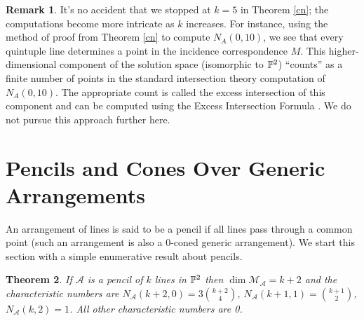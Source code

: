 \documentclass[12pt]{article}
\theoremstyle{plain}
\newtheorem{theorem}{Theorem}
\theoremstyle{definition}
\newtheorem{remark}[theorem]{Remark}
\newcommand{\A}{\mathcal{A}}
\newcommand{\M}{\mathcal{M}}
\newcommand{\N}{N}
\newcommand{\MLA}{\M_{\A}}
\renewcommand{\P}{\ensuremath \mathbb{P}}
\begin{document}
\begin{remark}
  It's no accident that we stopped at $k=5$ in Theorem \ref{cn}; the
  computations become more intricate as $k$ increases. For instance,
  using the method of proof from Theorem \ref{cn} to compute
  $N_A(0,10)$, we see that every quintuple line determines a point in
  the incidence correspondence $M$. This higher-dimensional component
  of the solution space (isomorphic to $\P^2$) ``counts'' as a finite number of points in the
  standard intersection theory computation of $N_A(0,10)$. The
  appropriate count is called the excess intersection of this
  component and can be computed using the Excess
  Intersection Formula \cite[section 6.3]{Fulton}. We do not pursue
  this approach further here. 

\end{remark}

\section{Pencils and Cones Over Generic Arrangements}
\label{section:dconed} 

An arrangement of lines is said to be a pencil if all lines pass
through a common point (such an arrangement is also a $0$-coned
generic arrangement). We start this section with a simple enumerative
result about pencils.

\begin{theorem}
If $\A$ is a pencil of $k$ lines in $\P^2$ then $\dim \MLA = k+2$ and
the characteristic numbers are $\N_\A(k+2,0) = 3\binom{k+2}{4}$,
$\N_\A(k+1,1) = \binom{k+1}{2}$, $\N_\A(k,2)=1$. All other
characteristic numbers are 0.  
\end{theorem}
\end{document}
